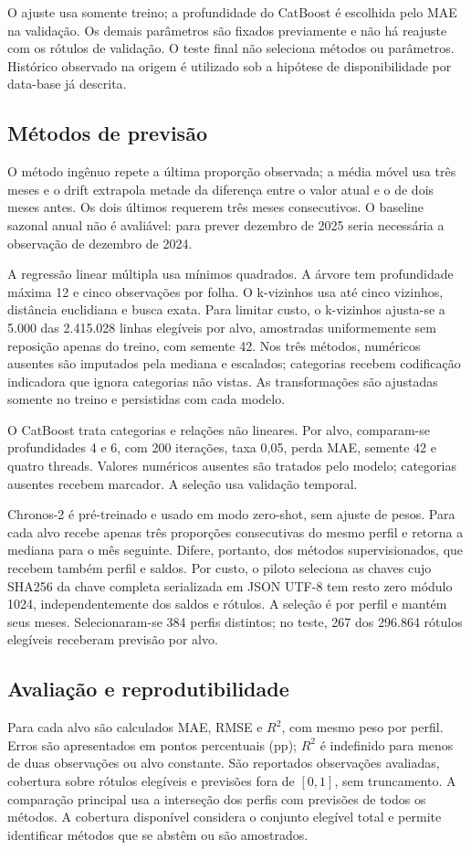 \documentclass[12pt]{article}
\begin{document}
O ajuste usa somente treino; a profundidade do CatBoost é escolhida pelo MAE
na validação. Os demais parâmetros são fixados previamente e não há reajuste
com os rótulos de validação. O teste final não seleciona métodos ou parâmetros.
Histórico observado na origem é utilizado sob a hipótese de disponibilidade
por data-base já descrita.

\subsection{Métodos de previsão}
O método ingênuo repete a última proporção observada; a média móvel usa três
meses e o drift extrapola metade da diferença entre o valor atual e o de dois
meses antes. Os dois últimos requerem três meses consecutivos. O baseline
sazonal anual não é avaliável: para prever dezembro de 2025 seria necessária
a observação de dezembro de 2024.

A regressão linear múltipla usa mínimos quadrados. A árvore tem profundidade
máxima 12 e cinco observações por folha. O k-vizinhos usa até cinco vizinhos,
distância euclidiana e busca exata. Para limitar custo, o k-vizinhos ajusta-se
a 5.000 das 2.415.028 linhas elegíveis por alvo, amostradas uniformemente
sem reposição apenas do treino, com semente 42. Nos três métodos, numéricos ausentes são
imputados pela mediana e escalados; categorias recebem codificação indicadora
que ignora categorias não vistas. As transformações são ajustadas somente no
treino e persistidas com cada modelo.

O CatBoost \cite{catboost} trata categorias e relações não lineares. Por alvo,
comparam-se profundidades 4 e 6, com 200 iterações, taxa 0,05, perda MAE,
semente 42 e quatro threads. Valores numéricos ausentes são tratados pelo
modelo; categorias ausentes recebem marcador. A seleção usa validação temporal.

Chronos-2 \cite{chronos2} é pré-treinado e usado em modo zero-shot, sem ajuste
de pesos. Para cada alvo recebe apenas três proporções consecutivas do mesmo
perfil e retorna a mediana para o mês seguinte. Difere, portanto, dos métodos
supervisionados, que recebem também perfil e saldos. Por custo, o piloto
seleciona as chaves cujo SHA256 da chave completa serializada em JSON UTF-8
tem resto zero módulo 1024, independentemente dos saldos e rótulos. A seleção
é por perfil e mantém seus meses. Selecionaram-se 384 perfis distintos; no
teste, 267 dos 296.864 rótulos elegíveis receberam previsão por alvo.

\subsection{Avaliação e reprodutibilidade}
Para cada alvo são calculados MAE, RMSE e $R^2$, com mesmo peso por perfil.
Erros são apresentados em pontos percentuais (pp); $R^2$ é indefinido para
menos de duas observações ou alvo constante. São reportados observações
avaliadas, cobertura sobre rótulos elegíveis e previsões fora de $[0,1]$,
sem truncamento. A comparação principal usa a interseção dos perfis com
previsões de todos os métodos. A cobertura disponível considera o conjunto
elegível total e permite identificar métodos que se abstêm ou são amostrados.
\end{document}
